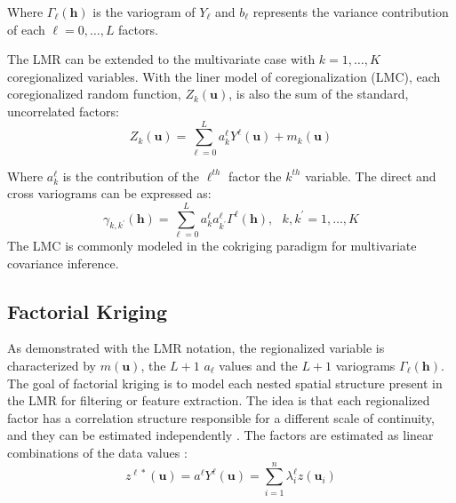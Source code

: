 Where $\Gamma_{\ell}(\mathbf{h})$ is the variogram of $Y_{\ell}$ and $b_{\ell}$ represents the variance contribution of each $\ell=0,\dots,L$ factors.

The LMR can be extended to the multivariate case with $k=1,\dots,K$ coregionalized variables. With the liner model of coregionalization (LMC), each coregionalized random function, $Z_{k}(\mathbf{u})$, is also the sum of the standard, uncorrelated factors:
\begin{equation*}
    Z_{k}(\mathbf{u}) = \sum_{\ell=0}^{L} a^{\ell}_{k} Y^{\ell}(\mathbf{u}) + m_{k}(\mathbf{u})
\end{equation*}

Where $a^{\ell}_{k}$ is the contribution of the $\ell^{th}$ factor the $k^{th}$ variable. The direct and cross variograms can be expressed as:
\begin{equation*}
    \gamma_{k,k^{\prime}}(\mathbf{h}) = \sum_{\ell=0}^{L} a^{\ell}_{k} a^{\ell}_{k^{\prime}} \Gamma^{\ell}(\mathbf{h}), \ \ \ k,k^{\prime} = 1,\dots,K
\end{equation*}
The LMC is commonly modeled in the cokriging paradigm for multivariate covariance inference.

\FloatBarrier
\subsection{Factorial Kriging}
\label{subsec:01factorial}

As demonstrated with the LMR notation, the regionalized variable is characterized by $m(\mathbf{u})$, the $L + 1$ $a_{\ell}$ values and the $L + 1$ variograms $\Gamma_{\ell}(\mathbf{h})$. The goal of factorial kriging is to model each nested spatial structure present in the LMR for filtering or feature extraction. The idea is that each regionalized factor has a correlation structure responsible for a different scale of continuity, and they can be estimated independently \citep{matheron1982factorial}. The factors are estimated as linear combinations of the data values \cite{deutsch2007recall}:
\begin{equation*}
    z^{\ell*}(\mathbf{u}) = a^{\ell} Y^{\ell}(\mathbf{u}) = \sum_{i=1}^{n} \lambda_{i}^{\ell} z(\mathbf{u}_{i})
\end{equation*}


